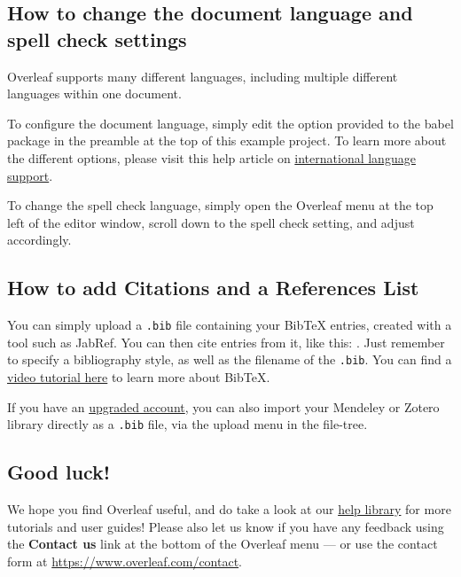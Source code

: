 \documentclass{article}
\begin{document}
\subsection{How to change the document language and spell check settings}

Overleaf supports many different languages, including multiple different languages within one document.

To configure the document language, simply edit the option provided to the babel package in the preamble at the top of this example project. To learn more about the different options, please visit this help article on \href{https://www.overleaf.com/learn/latex/International_language_support}{international language support}.

To change the spell check language, simply open the Overleaf menu at the top left of the editor window, scroll down to the spell check setting, and adjust accordingly.

\subsection{How to add Citations and a References List}

You can simply upload a \verb|.bib| file containing your BibTeX entries, created with a tool such as JabRef. You can then cite entries from it, like this: \cite{greenwade93}. Just remember to specify a bibliography style, as well as the filename of the \verb|.bib|. You can find a \href{https://www.overleaf.com/help/97-how-to-include-a-bibliography-using-bibtex}{video tutorial here} to learn more about BibTeX.

If you have an \href{https://www.overleaf.com/user/subscription/plans}{upgraded account}, you can also import your Mendeley or Zotero library directly as a \verb|.bib| file, via the upload menu in the file-tree.

\subsection{Good luck!}

We hope you find Overleaf useful, and do take a look at our \href{https://www.overleaf.com/learn}{help library} for more tutorials and user guides! Please also let us know if you have any feedback using the \textbf{Contact us} link at the bottom of the Overleaf menu --- or use the contact form at \url{https://www.overleaf.com/contact}.



\end{document}
